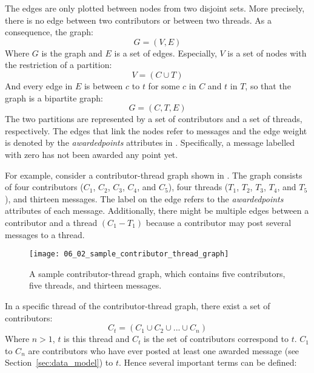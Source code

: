 The edges are only plotted between nodes from two disjoint sets. More precisely, there is no edge between two contributors or between two threads. As a consequence, the graph:
\[G=(V, E)\]
Where \(G\) is the graph and \(E\) is a set of edges. Especially, \(V\) is a set of nodes with the restriction of a partition:
\[V=(C \cup T)\]
And every edge in \(E\) is between \(c\) to \(t\) for some \(c\) in \(C\) and \(t\) in \(T\), so that the graph is a bipartite graph:
\[G=(C, T, E)\]
The two partitions are represented by a set of contributors and a set of threads, respectively. The edges that link the nodes refer to messages and the edge weight is denoted by the \emph{awardedpoints} attributes in . Specifically, a message labelled with zero has not been awarded any point yet.

For example, consider a contributor-thread graph shown in . The graph consists of four contributors (\(C_{1}\), \(C_{2}\), \(C_{3}\), \(C_{4}\), and \(C_{5}\)), four threads (\(T_{1}\), \(T_{2}\), \(T_{3}\), \(T_{4}\), and \(T_{5}\)), and thirteen messages. The label on the edge refers to the \emph{awardedpoints} attributes of each message. Additionally, there might be multiple edges between a contributor and a thread \((C_{1} - T_{1})\) because a contributor may post several messages to a thread.

\begin{figure}[!htb]
  \centering
  \texttt{[image: 06\_02\_sample\_contributor\_thread\_graph]}
  \caption{A sample contributor-thread graph, which contains five contributors, five threads, and thirteen messages.}
  \label{Figure:06_02}
\end{figure}

In a specific thread of the contributor-thread graph, there exist a set of contributors:
\[C_{t}=(C_{1} \cup C_{2} \cup ... \cup C_{n})\]
Where \(n > 1\), \(t\) is this thread and \(C_{t}\) is the set of contributors correspond to \(t\). \(C_{1}\) to \(C_{n}\) are contributors who have ever posted at least one awarded message (see Section~\ref{sec:data_model}) to \(t\). Hence several important terms can be defined:

